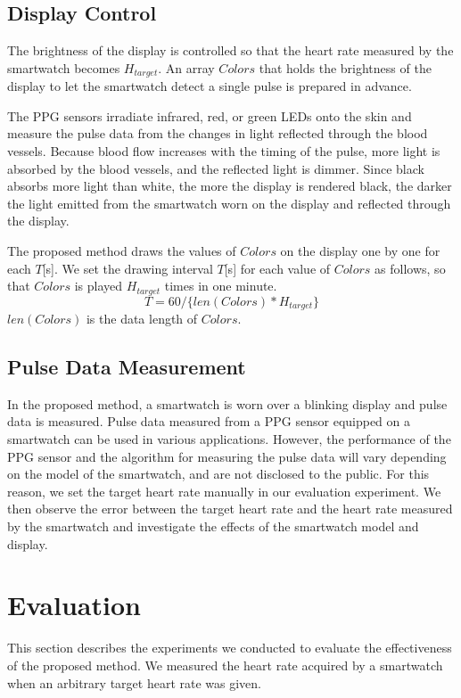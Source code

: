 \documentclass[sigchi,authordraft]{acmart}
\begin{document}
\subsection{Display Control}
\label{subsec:display_control}
The brightness of the display is controlled so that the heart rate measured by the smartwatch becomes $H_{target}$. An array $Colors$ that holds the brightness of the display to let the smartwatch detect a single pulse is prepared in advance.\par

The PPG sensors irradiate infrared, red, or green LEDs onto the skin and measure the pulse data from the changes in light reflected through the blood vessels. Because blood flow increases with the timing of the pulse, more light is absorbed by the blood vessels, and the reflected light is dimmer. Since black absorbs more light than white, the more the display is rendered black, the darker the light emitted from the smartwatch worn on the display and reflected through the display.\par

The proposed method draws the values of $Colors$ on the display one by one for each $T$[s]. We set the drawing interval $T$[s] for each value of $Colors$ as follows, so that $Colors$ is played $H_{target}$ times in one minute.
\begin{equation}
  \label{eqn:wait}
  T = 60 / \{len(Colors) * H_{target}\}
\end{equation}
$len(Colors)$ is the data length of $Colors$.


\subsection{Pulse Data Measurement}
In the proposed method, a smartwatch is worn over a blinking display and pulse data is measured. Pulse data measured from a PPG sensor equipped on a smartwatch can be used in various applications. However, the performance of the PPG sensor and the algorithm for measuring the pulse data will vary depending on the model of the smartwatch, and are not disclosed to the public. For this reason, we set the target heart rate manually in our evaluation experiment. We then observe the error between the target heart rate and the heart rate measured by the smartwatch and investigate the effects of the smartwatch model and display.



\section{Evaluation}
\label{sec:evaluation}
This section describes the experiments we conducted to evaluate the effectiveness of the proposed method. We measured the heart rate acquired by a smartwatch when an arbitrary target heart rate was given.
\end{document}

